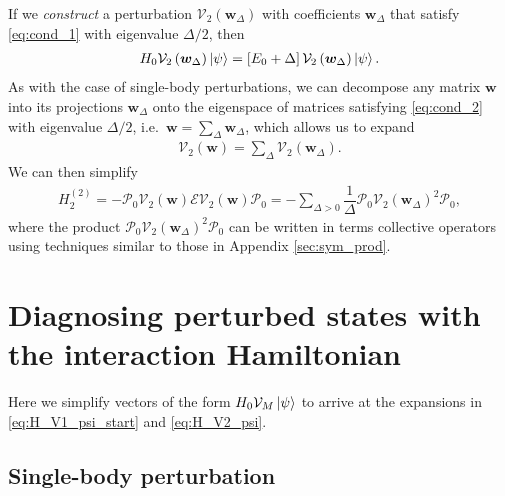 \documentclass[nofootinbib,notitlepage,11pt]{revtex4-2}
\newcommand{\f}[2]{\dfrac{#1}{#2}} %
\newcommand{\p}[1]{\left(#1\right)} %
\renewcommand{\sp}[1]{\left[#1\right]} %
\newcommand{\m}{\bm} %
\newcommand{\1}{\mathds{1}}
\newcommand{\E}{\mathcal{E}}
\renewcommand{\P}{\mathcal{P}}
\newcommand{\V}{\mathcal{V}}
\begin{document}
If we {\it construct} a perturbation $\V_2\p{\m w_\Delta}$ with
coefficients $\m w_\Delta$ that satisfy \eqref{eq:cond_1} with
eigenvalue $\Delta/2$, then
\begin{align}
  H_0 \V_2\p{\m w_\Delta} \ket\psi
  = \sp{E_0 + \Delta} \V_2\p{\m w_\Delta} \ket\psi.
  \label{eq:H_V1_psi}
\end{align}
As with the case of single-body perturbations, we can decompose any
matrix $\m w$ into its projections $\m w_\Delta$ onto the eigenspace
of matrices satisfying \eqref{eq:cond_2} with eigenvalue $\Delta/2$,
i.e.~$\m w=\sum_\Delta\m w_\Delta$, which allows us to expand
\begin{align}
  \V_2\p{\m w} = \sum_\Delta \V_2\p{\m w_\Delta}.
\end{align}
We can then simplify
\begin{align}
  H_2^{(2)} = - \P_0 \V_2\p{\m w} \E \V_2\p{\m w} \P_0
  = -\sum_{\Delta>0} \f1\Delta \P_0 \V_2\p{\m w_\Delta}^2 \P_0,
\end{align}
where the product $\P_0 \V_2\p{\m w_\Delta}^2 \P_0$ can be written in
terms collective operators using techniques similar to those in
Appendix \ref{sec:sym_prod}.

\appendix

\section{Diagnosing perturbed states with the interaction Hamiltonian}

Here we simplify vectors of the form $H_0\V_M\ket\psi$ to arrive at
the expansions in \eqref{eq:H_V1_psi_start} and \eqref{eq:H_V2_psi}.

\subsection{Single-body perturbation}
\label{sec:H_V1_psi}
\end{document}
